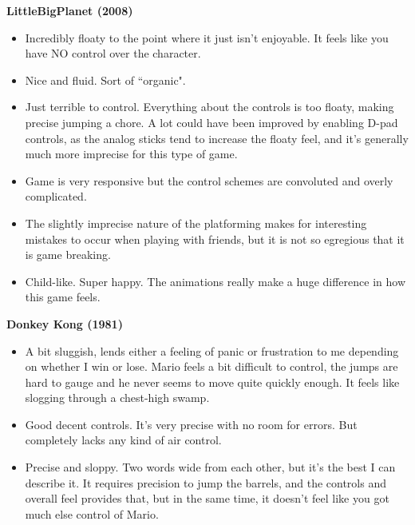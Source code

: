 \textbf{LittleBigPlanet (2008)}
\vspace{-5mm}
\begin{itemize}[noitemsep,nolistsep]
\item Incredibly floaty to the point where it just isn't enjoyable. It feels like you have NO control over the character.
\item Nice and fluid. Sort of ``organic".
\item Just terrible to control. Everything about the controls is too floaty, making precise jumping a chore. A lot could have been improved by enabling D-pad controls, as the analog sticks tend to increase the floaty feel, and it's generally much more imprecise for this type of game.
\item Game is very responsive but the control schemes are convoluted and overly complicated. 
\item The slightly imprecise nature of the platforming makes for interesting mistakes to occur when playing with friends, but it is not so egregious that it is game breaking. 
\item Child-like. Super happy. The animations really make a huge difference in how this game feels.
\end{itemize}

\textbf{Donkey Kong (1981)}
\vspace{-5mm}
\begin{itemize}[noitemsep,nolistsep]
\item A bit sluggish, lends either a feeling of panic or frustration to me depending on whether I win or lose. Mario feels a bit difficult to control, the jumps are hard to gauge and he never seems to move quite quickly enough. It feels like slogging through a chest-high swamp.
\item Good decent controls. It's very precise with no room for errors. But completely lacks any kind of air control.
\item Precise and sloppy. Two words wide from each other, but it's the best I can describe it. It requires precision to jump the barrels, and the controls and overall feel provides that, but in the same time, it doesn't feel like you got much else control of Mario.
\end{itemize}

